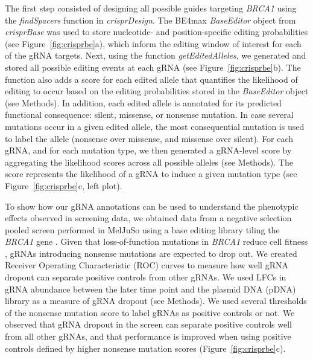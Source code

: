 \documentclass[pdftex,english,10pt]{article}
\begin{document}
The first step consisted of designing all possible guides targeting \textit{BRCA1} using the \textit{findSpacers} function in \textit{crisprDesign}. The BE4max \textit{BaseEditor} object from \textit{crisprBase} was used to store nucleotide- and position-specific editing probabilities (see Figure~\ref{fig:crisprbe}a), which inform the editing window of interest for each of the gRNA targets. Next, using the function \textit{getEditedAlleles}, we generated and stored all possible editing events at each gRNA (see Figure~\ref{fig:crisprbe}b). The function also adds a score for each edited allele that quantifies the likelihood of editing to occur based on the editing probabilities stored in the \textit{BaseEditor} object (see Methods). In addition, each edited allele is annotated for its predicted functional consequence: silent, missense, or nonsense mutation. In case several mutations occur in a given edited allele, the most consequential mutation is used to label the allele (nonsense over missense, and missense over silent).  For each gRNA, and for each mutation type, we then generated a gRNA-level score by aggregating the likelihood scores across all possible alleles (see Methods). The score represents the likelihood of a gRNA to induce a given mutation type (see Figure~\ref{fig:crisprbe}c, left plot). 

To show how our gRNA annotations can be used to understand the phenotypic effects observed in screening data, we obtained data from a negative selection pooled screen performed in MelJuSo using a base editing library tiling the \textit{BRCA1} gene \citep{hanna2021massively}. Given that loss-of-function mutations in \textit{BRCA1} reduce cell fitness \citep{findlay2018accurate}, gRNAs introducing nonsense mutations are expected to drop out. We created Receiver Operating Characteristic (ROC) curves to measure how well gRNA dropout can separate positive controls from other gRNAs. We used LFCs in gRNA abundance between the later time point and the plasmid DNA (pDNA) library as a measure of gRNA dropout (see Methods). We used several thresholds of the nonsense mutation score to label gRNAs as positive controls or not. We observed that gRNA dropout in the screen can separate positive controls well from all other gRNAs, and that performance is improved when using positive controls defined by higher nonsense mutation scores (Figure~\ref{fig:crisprbe}c). 
\end{document}
